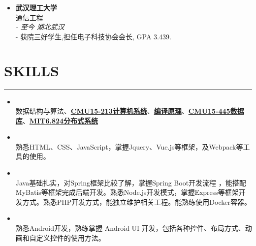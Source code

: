 \documentclass[11 pt, a4paper, usenames, dvipsnames]{article}
\newcommand*{\RoleFont}{%
      \fontsize{14}{8}%
\color{Black}%
\bf
      \selectfont}
\newcommand*{\DateFont}{%
      \fontsize{10}{8}%
\color{Gray}%
\it
      \selectfont}
\newcommand*{\AchFont}{%
      \fontsize{11}{8}%
\color{Gray}%
      \selectfont}
\newcommand*{\SectionFont}{%
      \fontsize{16}{5}%
\color{CV_Color}%
\bf
\selectfont}
\begin{document}
\begin{paracol}{2}
\begin{itemize}[leftmargin=0pt,align=left,labelwidth=\parindent,labelsep=0pt]
\item[] {\RoleFont 武汉理工大学} \\
\normalfont 通信工程 \\
{\DateFont 2017.9 - 至今 \hfill 湖北武汉 }\\
{\color{CV_Color}\LARGE - } 获院三好学生,担任电子科技协会会长, GPA 3.439.

\end{itemize}


\section*{\SectionFont\faStar\enskip SKILLS}\vspace{-15pt}
\par\noindent\rule{0.15\textwidth}{0.4pt} 
\begin{itemize}[leftmargin=0pt,align=left,labelwidth=\parindent,labelsep=0pt]

\item[] {} \\
{\AchFont 数据结构与算法、\href{https://www.bilibili.com/video/av31289365}{\textbf{CMU15-213计算机系统}}、\href{https://www.bilibili.com/video/av70600292}{\textbf{编译原理}}、\href{https://www.bilibili.com/video/av85655193}{\textbf{CMU15-445数据库}}、\href{https://www.bilibili.com/video/av91748150}{\textbf{MIT6.824分布式系统}}}


\item[] {} \\
{\AchFont 熟悉HTML、CSS、JavaScript，掌握Jquery、Vue.js等框架，及Webpack等工具的使用。}

\item[] {} \\
{\AchFont Java基础扎实，对Spring框架比较了解，掌握Spring Boot开发流程
，能搭配MyBatis等框架完成后端开发。熟悉Node.js开发模式，掌握Express等框架开发方式。熟悉PHP开发方式，能独立维护相关工程。能熟练使用Docker容器。}

\item[] {} \\
{\AchFont 熟悉Android开发，熟练掌握 Android UI 开发，包括各种控件、布局方式、动画和自定义控件的使用方法。}

\end {itemize}


\end{paracol}
\end{document}
